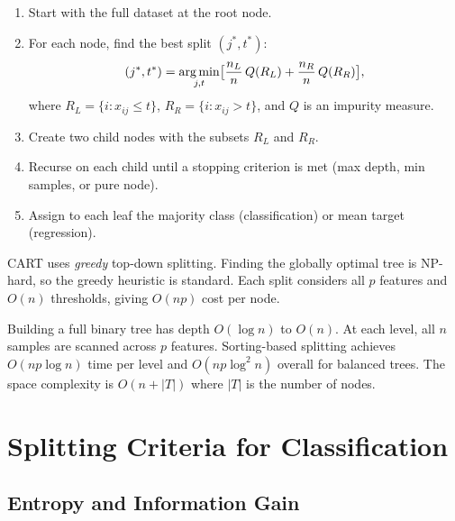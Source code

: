 \begin{algorithme}[title=\textbf{CART (Classification and Regression Trees)}]
\begin{enumerate}
    \item Start with the full dataset at the root node.
    \item For each node, find the best split $(j^*, t^*)$:
    \[
        (j^*, t^*) = \operatorname*{arg\,min}_{j,t}\bigl[\frac{n_L}{n}\,Q(R_L) + \frac{n_R}{n}\,Q(R_R)\bigr],
    \]
    where $R_L = \{i : x_{ij} \leq t\}$, $R_R = \{i : x_{ij} > t\}$, and $Q$ is an impurity measure.
    \item Create two child nodes with the subsets $R_L$ and $R_R$.
    \item Recurse on each child until a stopping criterion is met (max depth, min samples, or pure node).
    \item Assign to each leaf the majority class (classification) or mean target (regression).
\end{enumerate}
\end{algorithme}

\begin{remark}
CART uses \emph{greedy} top-down splitting. Finding the globally optimal tree is NP-hard, so the greedy heuristic is standard. Each split considers all $p$ features and $O(n)$ thresholds, giving $O(np)$ cost per node.
\end{remark}

\begin{proposition}
Building a full binary tree has depth $O(\log n)$ to $O(n)$. At each level, all $n$ samples are scanned across $p$ features. Sorting-based splitting achieves $O(np\log n)$ time per level and $O(np\log^2 n)$ overall for balanced trees. The space complexity is $O(n + |T|)$ where $|T|$ is the number of nodes.
\end{proposition}

\section{Splitting Criteria for Classification}

\subsection{Entropy and Information Gain}

